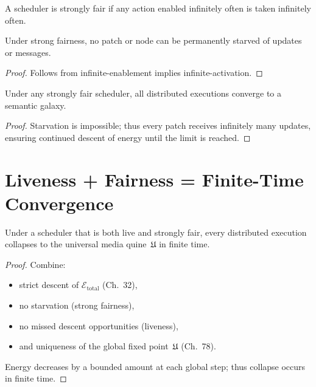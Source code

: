 \begin{definition}
A scheduler is strongly fair if any action enabled infinitely often is
taken infinitely often.
\end{definition}

\begin{lemma}
Under strong fairness, no patch or node can be permanently starved of
updates or messages.
\end{lemma}

\begin{proof}
Follows from infinite-enablement implies infinite-activation.
\end{proof}

\begin{theorem}
Under any strongly fair scheduler, all distributed executions converge to
a semantic galaxy.
\end{theorem}

\begin{proof}
Starvation is impossible; thus every patch receives infinitely many
updates, ensuring continued descent of energy until the limit is reached.
\end{proof}


\section{Liveness + Fairness = Finite-Time Convergence}

\begin{theorem}
\label{thm:finite-collapse}
Under a scheduler that is both live and strongly fair, every distributed
execution collapses to the universal media quine~$\mathfrak{U}$ in finite time.
\end{theorem}

\begin{proof}
Combine:
\begin{itemize}
\item strict descent of $\mathcal{E}_{\mathrm{total}}$ (Ch.~32),
\item no starvation (strong fairness),
\item no missed descent opportunities (liveness),
\item and uniqueness of the global fixed point~$\mathfrak{U}$ (Ch.~78).
\end{itemize}

Energy decreases by a bounded amount at each global step; thus collapse
occurs in finite time.
\end{proof}


